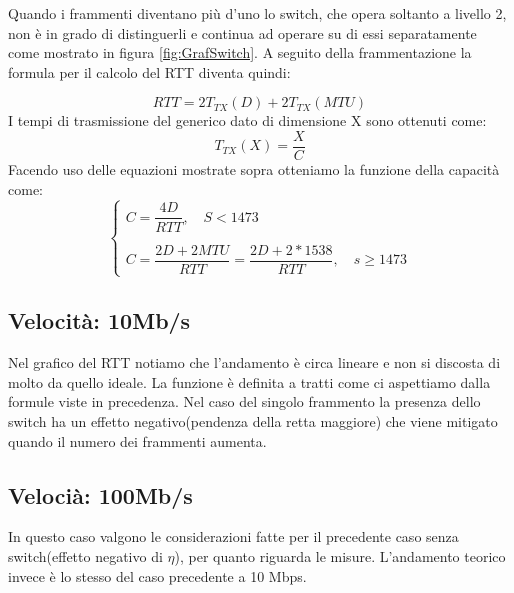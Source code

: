 \documentclass{exam}
\begin{document}
Quando i frammenti diventano più d'uno lo switch, che opera soltanto a livello 2, non è in grado di distinguerli e continua ad operare su di essi separatamente come mostrato in figura \ref{fig:GrafSwitch}.
A seguito della frammentazione la formula per il calcolo del RTT diventa quindi:
 
\begin{equation}
RTT = 2T_{TX}(D) + 2T_{TX}(MTU)
\end{equation}
I tempi di trasmissione del generico dato di dimensione X sono ottenuti come:
\begin{equation}
	T_{TX}(X) = \dfrac{X}{C}
\end{equation}
Facendo uso delle equazioni mostrate sopra otteniamo la funzione della capacità come:
\begin{equation}
	\begin{cases}
		C = \dfrac{4 D }{RTT}, \quad S < 1473 \\
		\\
		C = \dfrac{2D + 2MTU}{RTT} = \dfrac{2D + 2 * 1538}{RTT}, \quad s \geq 1473
	\end{cases}
\end{equation}
\subsection{Velocità: 10Mb/s}
Nel grafico del RTT notiamo che l'andamento è circa lineare e non si discosta di molto da quello ideale. La funzione è definita a tratti come ci aspettiamo dalla formule viste in precedenza. Nel caso del singolo frammento la presenza dello switch ha un effetto negativo(pendenza della retta maggiore) che viene mitigato quando il numero dei frammenti aumenta.

\subsection{Velocià: 100Mb/s}
In questo caso valgono le considerazioni fatte per il precedente caso senza switch(effetto negativo di $\eta$), per quanto riguarda le misure. L'andamento teorico invece è lo stesso del caso precedente a 10 Mbps.







\newpage
\end{document}
